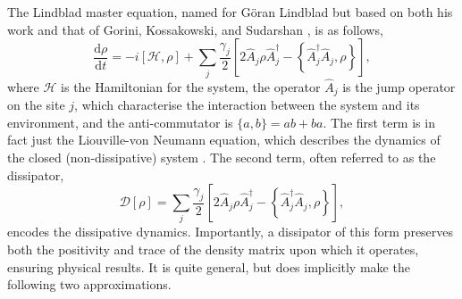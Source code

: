 The Lindblad master equation, named for G\"{o}ran Lindblad but based on both his work and that of Gorini, Kossakowski, and Sudarshan \cite{Lindblad1976,Gorini1976}, is as follows,
\begin{equation}
	\frac{\mathrm{d}\rho}{\mathrm{d}t} = -i [\mathcal{H}, \rho] + \sum_{j} \frac{\gamma_{j}}{2} \left[ 2\hat{A}_{j} \rho \hat{A}_{j}^{\dagger} - \left\{\hat{A}_{j}^{\dagger}\hat{A}_{j}, \rho\right\}\right],
	\label{eq:oqs3-1}
\end{equation}
where \(\mathcal{H}\) is the Hamiltonian for the system, the operator \(\hat{A}_{j}\) is the jump operator on the site \(j\), which characterise the interaction between the system and its environment, and the anti-commutator is \(\{a, b\} = ab + ba\). The first term is in fact just the Liouville-von Neumann equation, which describes the dynamics of the closed (non-dissipative) system \cite{BP_LvN}. The second term, often referred to as the dissipator,
\begin{equation}
	\mathcal{D}[\rho] = \sum_{j}\frac{\gamma_{j}}{2}\left[2\hat{A}_{j}\rho\hat{A}_{j}^{\dagger} - \left\{\hat{A}_{j}^{\dagger}\hat{A}_{j}, \rho\right\}\right],
	\label{eq:oqs3-2}
\end{equation}
encodes the dissipative dynamics. Importantly, a dissipator of this form preserves both the positivity and trace of the density matrix upon which it operates, ensuring physical results. It is quite general, but does implicitly make the following two approximations.

